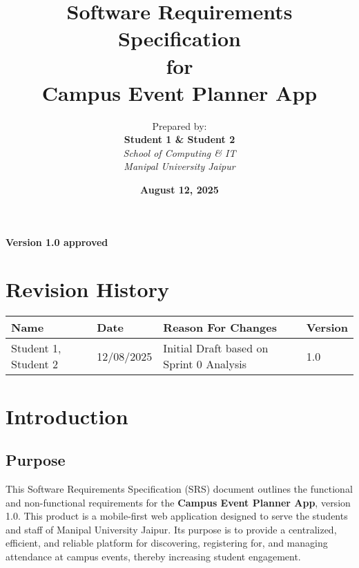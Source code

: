 \documentclass[11pt, a4paper]{article}
\title{
    \vspace{2cm} %
    \textbf{\huge Software Requirements Specification} \\
    \vspace{0.5cm}
    \large for \\
    \vspace{0.5cm}
    \textbf{\Huge Campus Event Planner App}
    \vspace{2cm}
}
\author{
    Prepared by: \\
    \textbf{Student 1 \& Student 2} \\
    \textit{School of Computing \& IT} \\
    \textit{Manipal University Jaipur}
}
\date{\textbf{August 12, 2025}}
\begin{document}
\begin{titlepage}
    \maketitle
    \vfill
    \begin{center}
        \textbf{Version 1.0 approved}
    \end{center}
\end{titlepage}

\tableofcontents
\newpage

\section*{Revision History}
\begin{tabular}{|m{4cm}|m{3cm}|m{6cm}|m{2cm}|}
    \hline
    \textbf{Name} & \textbf{Date} & \textbf{Reason For Changes} & \textbf{Version} \\
    \hline
    Student 1, Student 2 & 12/08/2025 & Initial Draft based on Sprint 0 Analysis & 1.0 \\
    \hline
\end{tabular}
\newpage


\section{Introduction}

\subsection{Purpose}
This Software Requirements Specification (SRS) document outlines the functional and non-functional requirements for the \textbf{Campus Event Planner App}, version 1.0. This product is a mobile-first web application designed to serve the students and staff of Manipal University Jaipur. Its purpose is to provide a centralized, efficient, and reliable platform for discovering, registering for, and managing attendance at campus events, thereby increasing student engagement.
\end{document}
